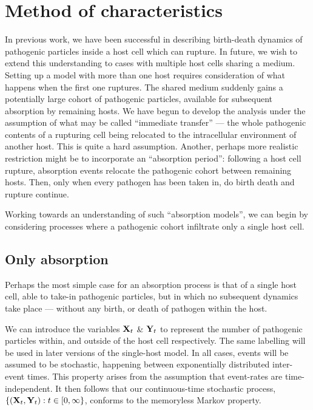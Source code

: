 \section{Method of characteristics}




In previous work, we have been successful in describing birth-death dynamics of pathogenic particles inside a host cell which can rupture. In future, we wish to extend this understanding to cases with multiple host cells sharing a medium. Setting up a model with more than one host requires consideration of what happens when the first one ruptures. The shared medium suddenly gains a potentially large cohort of pathogenic particles, available for subsequent absorption by remaining hosts. We have begun to develop the analysis under the assumption of what may be called ``immediate transfer'' --- the whole pathogenic contents of a rupturing cell being relocated to the intracellular environment of another host. This is quite a hard assumption. Another, perhaps more realistic restriction might be to incorporate an ``absorption period'': following a host cell rupture, absorption events relocate the pathogenic cohort between remaining hosts. Then, only when every pathogen has been taken in, do birth death and rupture continue. 

Working towards an understanding of such ``absorption models'', we can begin by considering processes where a pathogenic cohort infiltrate only a single host cell. 

\subsection{Only absorption} 
Perhaps the most simple case for an absorption process is that of a single host cell, able to take-in pathogenic particles, but in which no subsequent dynamics take place --- without any birth, or death of pathogen within the host. 

We can introduce the variables ${{\bf X}_t}$ \& ${{\bf Y}_t}$ to represent the number of pathogenic particles within, and outside of the host cell respectively. The same labelling will be used in later versions of the single-host model. In all cases, events will be assumed to be stochastic, happening between exponentially distributed inter-event times. This property arises from the assumption that event-rates are time-independent. It then follows that our continuous-time stochastic process, $\{({{\bf X}_t}, {{\bf Y}_t}) : t\in[0,\infty\}$, conforms to the memoryless Markov property.

